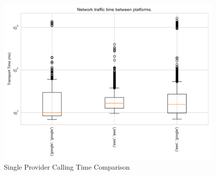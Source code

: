 \documentclass[../main.tex]{subfiles}
\begin{document}
\begin{figure}
\begin{center}
  \includegraphics[width=\linewidth,keepaspectratio]{./boxplot_network_transport.png}
\end{center}
\caption{Single Provider Calling Time Comparison}%
\label{fig:boxplot_network_transport}
\end{figure}
\end{document}
